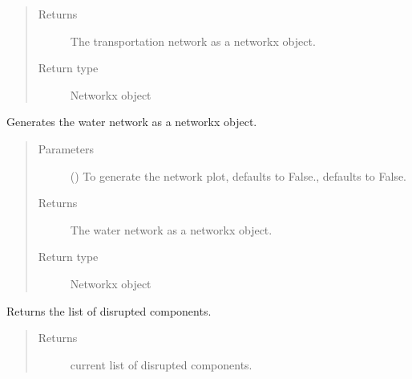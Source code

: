 \documentclass[letterpaper,10pt,english]{sphinxmanual}
\begin{document}
\begin{fulllineitems}
\begin{fulllineitems}
\begin{quote}
\begin{description}
\item[{Returns}] \leavevmode
\sphinxAtStartPar
The transportation network as a networkx object.

\item[{Return type}] \leavevmode
\sphinxAtStartPar
Networkx object

\end{description}\end{quote}

\end{fulllineitems}


\begin{fulllineitems}
\label{\detokenize{apidoc:dreaminsg_integrated_model.src.network_sim_models.integrated_network.IntegratedNetwork.generate_water_networkx_graph}}
\sphinxAtStartPar
Generates the water network as a networkx object.
\begin{quote}\begin{description}
\item[{Parameters}] \leavevmode
\sphinxAtStartPar
{} (\sphinxstyleliteralemphasis{\sphinxupquote{, }}) \textendash{} To generate the network plot, defaults to False., defaults to False.

\item[{Returns}] \leavevmode
\sphinxAtStartPar
The water network as a networkx object.

\item[{Return type}] \leavevmode
\sphinxAtStartPar
Networkx object

\end{description}\end{quote}

\end{fulllineitems}


\begin{fulllineitems}
\label{\detokenize{apidoc:dreaminsg_integrated_model.src.network_sim_models.integrated_network.IntegratedNetwork.get_disrupted_components}}
\sphinxAtStartPar
Returns the list of disrupted components.
\begin{quote}\begin{description}
\item[{Returns}] \leavevmode
\sphinxAtStartPar
current list of disrupted components.


\end{description}
\end{quote}
\end{fulllineitems}
\end{fulllineitems}
\end{document}

